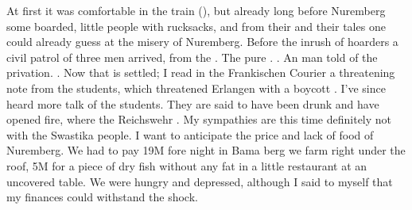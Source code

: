 \documentclass{article}
\begin{document}
At first it was comfortable in the train (), but already long before Nuremberg some  boarded, little people with rucksacks, and from their  and their tales one could already guess at the misery of Nuremberg. Before the inrush of hoarders a civil patrol of three men arrived, from the . The pure . . An  man told of the privation. . Now that is settled; I read in the Frankischen Courier a threatening note from the students, which threatened Erlangen with a boycott . I've since heard more talk of the students. They are said to have been drunk and have opened fire, where the Reichswehr . My sympathies are this time definitely not with the Swastika people.
I want to anticipate the price and lack of food of Nuremberg. We had to pay 19M fore night in Bama berg we farm right under the roof, 5M for a piece of dry fish without any fat in a little restaurant at an uncovered table. We were hungry and depressed, although I said to myself that my finances could withstand the shock.
\end{document}
